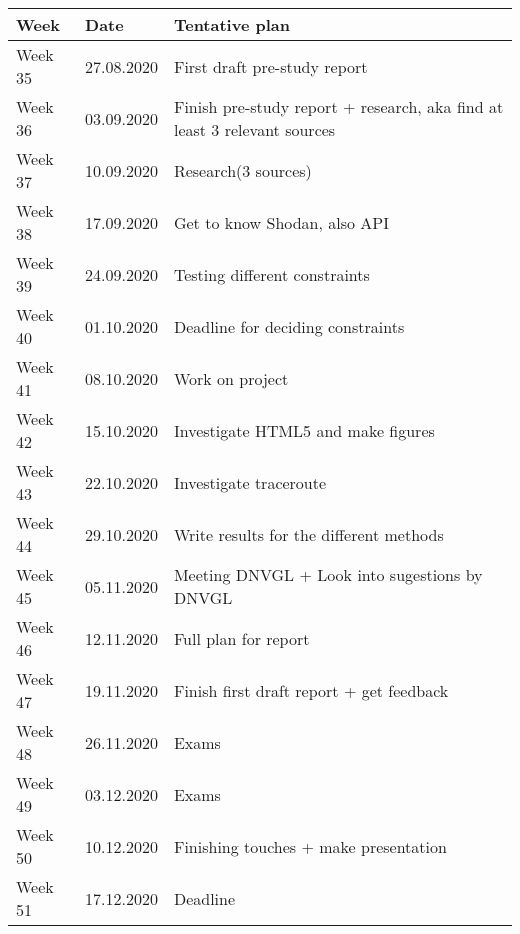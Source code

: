 \begin{tabular}{|l|l|l|}
\hline
Week & Date & Tentative plan                                                                     \\ \hline
Week 35 & 27.08.2020 & First draft pre-study report                                              \\ \hline
Week 36 & 03.09.2020 & Finish pre-study report + research, aka find at least 3 relevant sources  \\ \hline
Week 37 & 10.09.2020 & Research(3 sources)                                                       \\ \hline
Week 38 & 17.09.2020 & Get to know Shodan, also API                                              \\ \hline
Week 39 & 24.09.2020 & Testing different constraints                                             \\ \hline
Week 40 & 01.10.2020 & Deadline for deciding constraints                                         \\ \hline
Week 41 & 08.10.2020 & Work on project                                                           \\ \hline
Week 42 & 15.10.2020 & Investigate HTML5 and make figures                                        \\ \hline
Week 43 & 22.10.2020 & Investigate traceroute                                                    \\ \hline
Week 44 & 29.10.2020 & Write results for the different methods                                   \\ \hline
Week 45 & 05.11.2020 & Meeting DNVGL + Look into sugestions by DNVGL                                             \\ \hline
Week 46 & 12.11.2020 & Full plan for report                                                      \\ \hline
Week 47 & 19.11.2020 & Finish first draft report + get feedback                                  \\ \hline
Week 48 & 26.11.2020 & Exams                                                                     \\ \hline
Week 49 & 03.12.2020 & Exams                                                                     \\ \hline
Week 50 & 10.12.2020 & Finishing touches + make presentation                                     \\ \hline
Week 51 & 17.12.2020 & Deadline                                                                  \\ \hline
\end{tabular}

